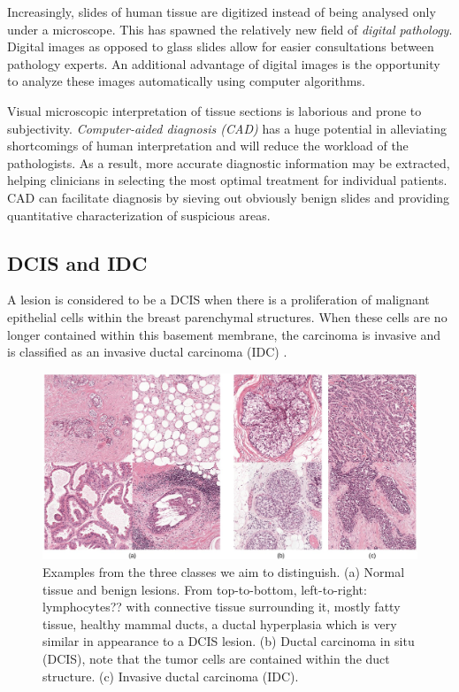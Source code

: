 \documentclass[journal]{IEEEtran}
\begin{document}
Increasingly, slides of human tissue are digitized instead of being analysed only under a microscope. This has spawned the relatively new field of \emph{digital pathology}. Digital images as opposed to glass slides allow for  easier consultations between pathology experts. An additional advantage of digital images is the opportunity to analyze these images automatically using computer algorithms.

Visual microscopic interpretation of tissue sections is laborious and prone to subjectivity. \emph{Computer-aided diagnosis (CAD)} has a huge potential in alleviating shortcomings of human interpretation and will reduce the workload of the pathologists. As a result, more accurate diagnostic information may be extracted, helping clinicians in selecting the most optimal treatment for individual patients. CAD can facilitate diagnosis by sieving out obviously benign slides and providing quantitative characterization of suspicious areas.

\subsection{DCIS and IDC}
A lesion is considered to be a DCIS when there is a proliferation of malignant epithelial cells within the breast parenchymal structures. When these cells are no longer contained within this basement membrane, the carcinoma is invasive and is classified as an invasive ductal carcinoma (IDC) \cite{ellis2010intraductal}.



\begin{figure}[!t]
\centering
\includegraphics[width=7in]{lesion_examples}%
\caption{Examples from the three classes we aim to distinguish. (a) Normal tissue and benign lesions. From top-to-bottom, left-to-right: lymphocytes?? with connective tissue surrounding it, mostly fatty tissue, healthy mammal ducts, a ductal hyperplasia which is very similar in appearance to a DCIS lesion. (b) Ductal carcinoma in situ (DCIS), note that the tumor cells are contained within the duct structure. (c) Invasive ductal carcinoma (IDC).}
\end{figure}
\end{document}

